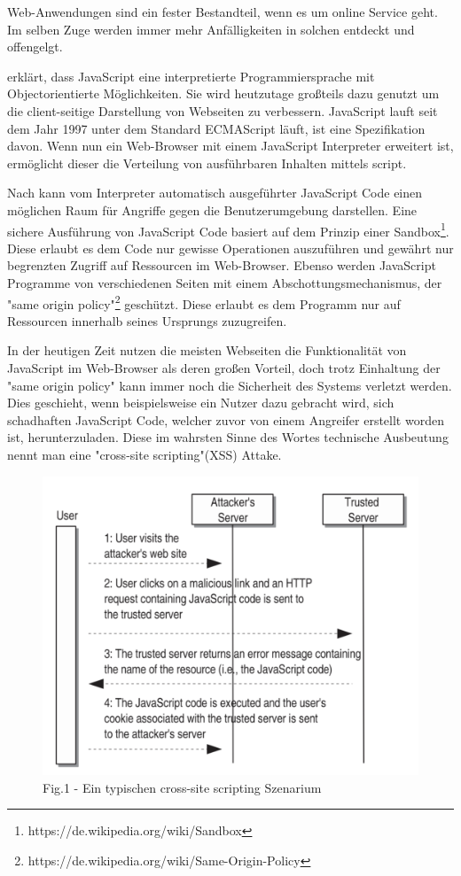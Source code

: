 Web-Anwendungen sind ein fester Bestandteil, wenn es um online Service geht. Im selben Zuge werden immer mehr Anfälligkeiten in solchen entdeckt und offengelgt. \autocite[1]{kirda2009}

\textcite[4]{flanagan2017} erklärt, dass JavaScript eine interpretierte Programmiersprache mit Objectorientierte Möglichkeiten. Sie wird heutzutage großteils dazu genutzt um die client-seitige Darstellung von Webseiten zu verbessern.
JavaScript lauft seit dem Jahr 1997 unter dem Standard ECMAScript\cite[43]{ecma2018} läuft, ist eine Spezifikation davon. Wenn nun ein Web-Browser mit einem JavaScript Interpreter erweitert ist, ermöglicht dieser die Verteilung von ausführbaren Inhalten mittels script.

Nach \textcite[1]{kirda2009} kann vom Interpreter automatisch ausgeführter JavaScript Code einen möglichen Raum für Angriffe gegen die Benutzerumgebung darstellen. Eine sichere Ausführung von JavaScript Code basiert auf dem Prinzip einer Sandbox\footnote[1]{https://de.wikipedia.org/wiki/Sandbox}. Diese erlaubt es dem Code nur gewisse Operationen auszuführen und gewährt nur begrenzten Zugriff auf Ressourcen im Web-Browser. Ebenso werden JavaScript Programme von verschiedenen Seiten mit einem Abschottungsmechanismus, der "same origin policy"\footnote[2]{https://de.wikipedia.org/wiki/Same-Origin-Policy} geschützt. Diese erlaubt es dem Programm nur auf Ressourcen innerhalb seines Ursprungs zuzugreifen.

In der heutigen Zeit nutzen die meisten Webseiten die Funktionalität von JavaScript im Web-Browser als deren großen Vorteil, doch trotz Einhaltung der "same origin policy" kann immer noch die Sicherheit des Systems verletzt werden. Dies geschieht, wenn beispielsweise ein Nutzer dazu gebracht wird, sich schadhaften JavaScript Code, welcher zuvor von einem Angreifer erstellt worden ist, herunterzuladen. Diese im wahrsten Sinne des Wortes technische Ausbeutung nennt man eine "cross-site scripting"(XSS) Attake.\autocite[2]{kirda2009}

\begin{figure}[ht]
	\centering
	\includegraphics[width=0.5\linewidth]{images/cross-site-scripting_scenario-kirda2009_p2.png}
	\caption{Fig.1 - Ein typischen cross-site scripting Szenarium\autocite[p]{kirda2009}}
\end{figure}
